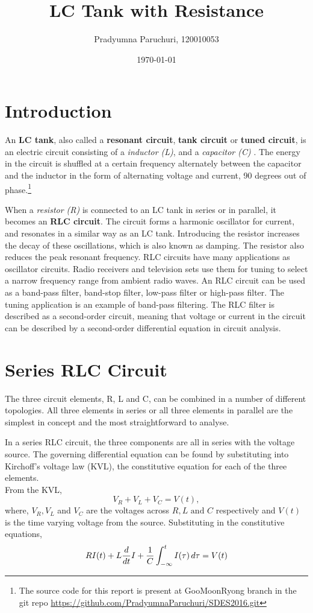 \documentclass[12pt, twosides]{article}
\title{LC Tank with Resistance}
\date{\today}
\author{Pradyumna Paruchuri, 120010053}
\newcommand{\voltage}{\ensuremath{V}}
\newcommand{\curr}{I}
\newcommand{\res}{R}
\newcommand{\capc}{C}
\newcommand{\ind}{L}
\newcommand{\der}[1]{
\ifnum#1=1
	\frac{d}{dt}
\else
	\frac{d^#1}{dt^#1}
\fi
}
\begin{document}
	\maketitle
	
	\section{Introduction}
		An \textbf{LC tank}, also called a \textbf{resonant circuit}, \textbf{tank circuit} or \textbf{tuned circuit}, is an electric circuit consisting of a \textit{inductor (L)}, and a \textit{capacitor (C)} \cite{Wikipedia}. The energy in the circuit is shuffled at a certain frequency alternately between the capacitor and the inductor in the form of alternating voltage and current, 90 degrees out of phase.\footnote{\label{source} The source code for this report is present at GooMoonRyong branch in the git repo \url{https://github.com/PradyumnaParuchuri/SDES2016.git} }

		When a \textit{resistor (R)} is connected to an LC tank in series or in parallel, it becomes an \textbf{RLC circuit}. The circuit forms a harmonic oscillator for current, and resonates in a similar way as an LC tank. Introducing the resistor increases the decay of these oscillations, which is also known as damping. The resistor also reduces the peak resonant frequency.
		RLC circuits have many applications as oscillator circuits. Radio receivers and television sets use them for tuning to select a narrow frequency range from ambient radio waves. An RLC circuit can be used as a band-pass filter, band-stop filter, low-pass filter or high-pass filter. The tuning application is an example of band-pass filtering. The RLC filter is described as a second-order circuit, meaning that voltage or current in the circuit can be described by a second-order differential equation in circuit analysis.

	\section{Series RLC Circuit}

		The three circuit elements, R, L and C, can be combined in a number of different topologies. All three elements in series or all three elements in parallel are the simplest in concept and the most straightforward to analyse.

		In a series RLC circuit, the three components are all in series with the voltage source. The governing differential equation can be found by substituting into Kirchoff's voltage law (KVL), the constitutive equation for each of the three elements.\\
		From the KVL,
		\[ \voltage_{R} + \voltage_{L} + \voltage_{C} = \voltage(t),\]
		where, \(\voltage_R, \voltage_L\) and \(\voltage_C\) are the voltages across \(\res, \ind \text{ and } \capc\) respectively and \(\voltage(t)\) is the time varying voltage from the source. Substituting in the constitutive equations,
		\begin{equation}
		\label{e:series RLC}
			\res \curr(t) + \ind \der{1} \curr + \frac{1}{\capc} \int_{-\infty}^{t} I(\tau)\, d\tau = \voltage(t)
		\end{equation}
		
\end{document}
